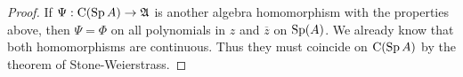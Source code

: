 \begin{proof}
 If $\Psi : \operatorname{C} ( \operatorname{Sp} A) \to \mathfrak{A}$ is another algebra homomorphism with the 
 properties above, then $\Psi = \Phi$ on all polynomials in $z$ and 
 $\overline{z}$ on $\operatorname{Sp} (A)$. We already know that both homomorphisms are
 continuous. Thus  they must coincide on $\operatorname{C} ( \operatorname{Sp} A )$ by the theorem
 of Stone-Weierstrass.
\end{proof}





